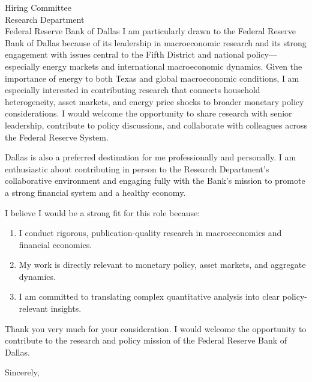 \documentclass[11pt,letterpaper]{letter}
\begin{document}
\begin{letter}{
Hiring Committee \\
Research Department \\
Federal Reserve Bank of Dallas
}
I am particularly drawn to the Federal Reserve Bank of Dallas because of its leadership in macroeconomic research and its strong engagement with issues central to the Fifth District and national policy—especially energy markets and international macroeconomic dynamics. Given the importance of energy to both Texas and global macroeconomic conditions, I am especially interested in contributing research that connects household heterogeneity, asset markets, and energy price shocks to broader monetary policy considerations. I would welcome the opportunity to share research with senior leadership, contribute to policy discussions, and collaborate with colleagues across the Federal Reserve System.

Dallas is also a preferred destination for me professionally and personally. I am enthusiastic about contributing in person to the Research Department’s collaborative environment and engaging fully with the Bank’s mission to promote a strong financial system and a healthy economy.

I believe I would be a strong fit for this role because:
\begin{enumerate}
    \item I conduct rigorous, publication-quality research in macroeconomics and financial economics.
    \item My work is directly relevant to monetary policy, asset markets, and aggregate dynamics.
    \item I am committed to translating complex quantitative analysis into clear policy-relevant insights.
\end{enumerate}

Thank you very much for your consideration. I would welcome the opportunity to contribute to the research and policy mission of the Federal Reserve Bank of Dallas.

\closing{Sincerely,}

\end{letter}
\end{document}
